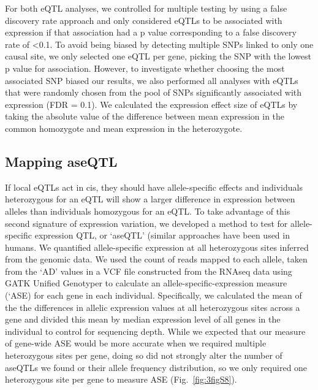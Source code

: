 For both eQTL analyses, we controlled for multiple testing by using a false discovery rate approach \citep{Storey} and only considered eQTLs to be associated with expression if that association had a p value corresponding to a false discovery rate of <0.1. To avoid being biased by detecting multiple SNPs linked to only one causal site, we only selected one eQTL per gene, picking the SNP with the lowest p value for association. However, to investigate whether choosing the most associated SNP biased our results, we also performed all analyses with eQTLs that were randomly chosen from the pool of SNPs significantly associated with expression (FDR = 0.1). We calculated the expression effect size of eQTLs by taking the absolute value of the difference between mean expression in the common homozygote and mean expression in the heterozygote. 

\subsection{Mapping aseQTL}
If local eQTLs act in cis, they should have allele-specific effects and individuals heterozygous for an eQTL will show a larger difference in expression between alleles than individuals homozygous for an eQTL. To take advantage of this second signature of expression variation, we developed a method to test for allele-specific expression QTL, or ‘aseQTL’ (similar approaches have been used in humans\citep{Battle2014-ke}. We quantified allele-specific expression at all heterozygous sites inferred from the genomic data. We used the count of reads mapped to each allele, taken from the ‘AD’ values in a VCF file constructed from the RNAseq data using GATK Unified Genotyper to calculate an allele-specific-expression measure (‘ASE) for each gene in each individual. Specifically, we calculated the mean of the the differences in allelic expression values at all heterozygous sites across a gene and divided this mean by median expression level of all genes in the individual to control for sequencing depth. While we expected that our measure of gene-wide ASE would be more accurate when we required multiple heterozygous sites per gene, doing so did not strongly alter the number of aseQTLs we found or their allele frequency distribution, so we only required one heterozygous site per gene to measure ASE (Fig.~\ref{fig:3figS8}).


